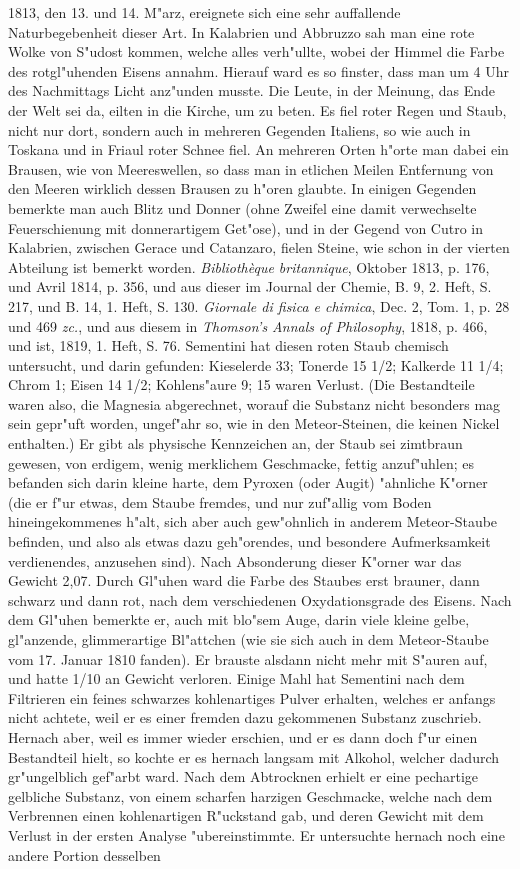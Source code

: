 \documentclass[a4paper, 11pt, oneside, polutonikogreek, german]{article}
\begin{document}
1813, den 13. und 14. M"arz, ereignete sich eine sehr auffallende Naturbegebenheit dieser Art. In Kalabrien und Abbruzzo sah man eine rote Wolke von S"udost kommen, welche alles verh"ullte, wobei der Himmel die Farbe des rotgl"uhenden Eisens annahm. Hierauf ward es so finster, dass man um 4 Uhr des Nachmittags Licht anz"unden musste. Die Leute, in der Meinung, das Ende der Welt sei da, eilten in die Kirche, um zu beten. Es fiel roter Regen und Staub, nicht nur dort, sondern auch in mehreren Gegenden Italiens, so wie auch in Toskana und in Friaul roter Schnee fiel. An mehreren Orten h"orte man dabei ein Brausen, wie von Meereswellen, so dass man in etlichen Meilen Entfernung von den Meeren wirklich dessen Brausen zu h"oren glaubte. In einigen Gegenden bemerkte man auch Blitz und Donner (ohne Zweifel eine damit verwechselte Feuerschienung mit donnerartigem Get"ose), und in der Gegend von Cutro in Kalabrien, zwischen Gerace und Catanzaro, fielen Steine, wie schon in der vierten Abteilung ist bemerkt worden. \emph{Bibliothèque britannique}, Oktober 1813, p. 176, und Avril 1814, p. 356, und aus dieser im Journal der Chemie, B. 9, 2. Heft, S. 217, und B. 14, 1. Heft, S. 130. \emph{Giornale di fisica e chimica}, Dec. 2, Tom. 1, p. 28 und 469 \emph{zc.}, und aus diesem in \emph{Thomson's Annals of Philosophy}, 1818, p. 466, und ist, 1819, 1. Heft, S. 76. Sementini hat diesen roten Staub chemisch untersucht, und darin gefunden: Kieselerde 33; Tonerde 15 1/2; Kalkerde 11 1/4; Chrom 1; Eisen 14 1/2; Kohlens"aure 9; 15 waren Verlust. (Die Bestandteile waren also, die Magnesia abgerechnet, worauf die Substanz nicht besonders mag sein gepr"uft worden, ungef"ahr so, wie in den Meteor-Steinen, die keinen Nickel enthalten.) Er gibt als physische Kennzeichen an, der Staub sei zimtbraun gewesen, von erdigem, wenig merklichem Geschmacke, fettig anzuf"uhlen; es befanden sich darin kleine harte, dem Pyroxen (oder Augit) "ahnliche K"orner (die er f"ur etwas, dem Staube fremdes, und nur zuf"allig vom Boden hineingekommenes h"alt, sich aber auch gew"ohnlich in anderem Meteor-Staube befinden, und also als etwas dazu geh"orendes, und besondere Aufmerksamkeit verdienendes, anzusehen sind). Nach Absonderung dieser K"orner war das Gewicht 2,07. Durch Gl"uhen ward die Farbe des Staubes erst brauner, dann schwarz und dann rot, nach dem verschiedenen Oxydationsgrade des Eisens. Nach dem Gl"uhen bemerkte er, auch mit blo"sem Auge, darin viele kleine gelbe, gl"anzende, glimmerartige Bl"attchen (wie sie sich auch in dem Meteor-Staube vom 17. Januar 1810 fanden). Er brauste alsdann nicht mehr mit S"auren auf, und hatte 1/10 an Gewicht verloren. Einige Mahl hat Sementini nach dem Filtrieren ein feines schwarzes kohlenartiges Pulver erhalten, welches er anfangs nicht achtete, weil er es einer fremden dazu gekommenen Substanz zuschrieb. Hernach aber, weil es immer wieder erschien, und er es dann doch f"ur einen Bestandteil hielt, so kochte er es hernach langsam mit Alkohol, welcher dadurch gr"ungelblich gef"arbt ward. Nach dem Abtrocknen erhielt er eine pechartige gelbliche Substanz, von einem scharfen harzigen Geschmacke, welche nach dem Verbrennen einen kohlenartigen R"uckstand gab, und deren Gewicht mit dem Verlust in der ersten Analyse "ubereinstimmte. Er untersuchte hernach noch eine andere Portion desselben 
\end{document}
